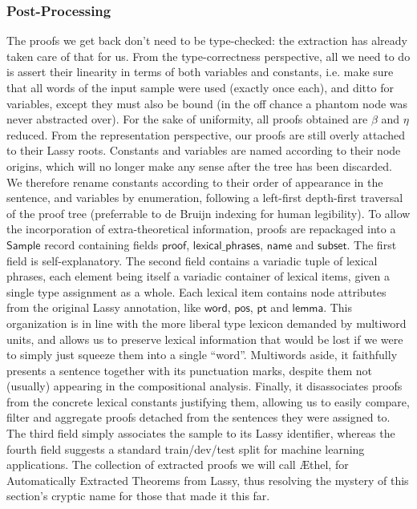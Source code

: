 \subsubsection{Post-Processing}
The proofs we get back don't need to be type-checked: the extraction has already taken care of that for us.
From the type-correctness perspective, all we need to do is assert their linearity in terms of both variables and constants, i.e. make sure that all words of the input sample were used (exactly once each), and ditto for variables, except they must also be bound (in the off chance a phantom node was never abstracted over).
For the sake of uniformity, all proofs obtained are $\beta$ and $\eta$ reduced.
From the representation perspective, our proofs are still overly attached to their Lassy roots.
Constants and variables are named according to their node origins, which will no longer make any sense after the tree has been discarded.
We therefore rename constants according to their order of appearance in the sentence, and variables by enumeration, following a left-first depth-first traversal of the proof tree (preferrable to de Bruijn indexing for human legibility).
To allow the incorporation of extra-theoretical information, proofs are repackaged into a $\mathsf{Sample}$ record containing fields $\mathsf{proof}$, $\mathsf{lexical\_phrases}$, $\mathsf{name}$ and $\mathsf{subset}$.
The first field is self-explanatory.
The second field contains a variadic tuple of lexical phrases, each element being itself a variadic container of lexical items, given a single type assignment as a whole.
Each lexical item contains node attributes from the original Lassy annotation, like $\mathsf{word}$, $\mathsf{pos}$, $\mathsf{pt}$ and $\mathsf{lemma}$.
This organization is in line with the more liberal type lexicon demanded by multiword units, and allows us to preserve lexical information that would be lost if we were to simply just squeeze them into a single ``word''.
Multiwords aside, it faithfully presents a sentence together with its punctuation marks, despite them not (usually) appearing in the compositional analysis.
Finally, it disassociates proofs from the concrete lexical constants justifying them, allowing us to easily compare, filter and aggregate proofs detached from the sentences they were assigned to.
The third field simply associates the sample to its Lassy identifier, whereas the fourth field suggests a standard train/dev/test split for machine learning applications.
The collection of extracted proofs we will call \AE thel, for Automatically Extracted Theorems from Lassy, thus resolving the mystery of this section's cryptic name for those that made it this far.

